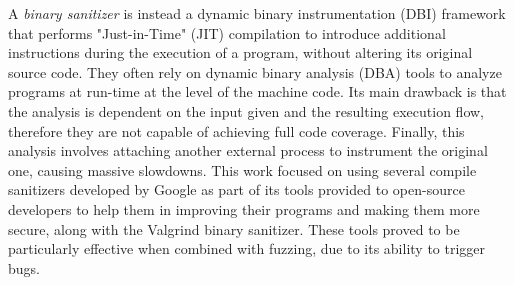 \newline
A \textit{binary sanitizer} is instead a dynamic binary instrumentation (DBI) framework that performs "Just-in-Time" (JIT) compilation to introduce additional instructions during the execution of a program, without altering its original source code. They often rely on dynamic binary analysis (DBA) tools to analyze programs at run-time at the level of the machine code. Its main drawback is that the analysis is dependent on the input given and the resulting execution flow, therefore they are not capable of achieving full code coverage. Finally, this analysis involves attaching another external process to instrument the original one, causing massive slowdowns.  
\newline \newline
This work focused on using several compile sanitizers developed by Google \cite{san_repo} as part of its tools provided to open-source developers to help them in improving their programs and making them more secure, along with the Valgrind \cite{valgrind_web} binary sanitizer. These tools proved to be particularly effective when combined with fuzzing, due to its ability to trigger bugs.


\newpage
